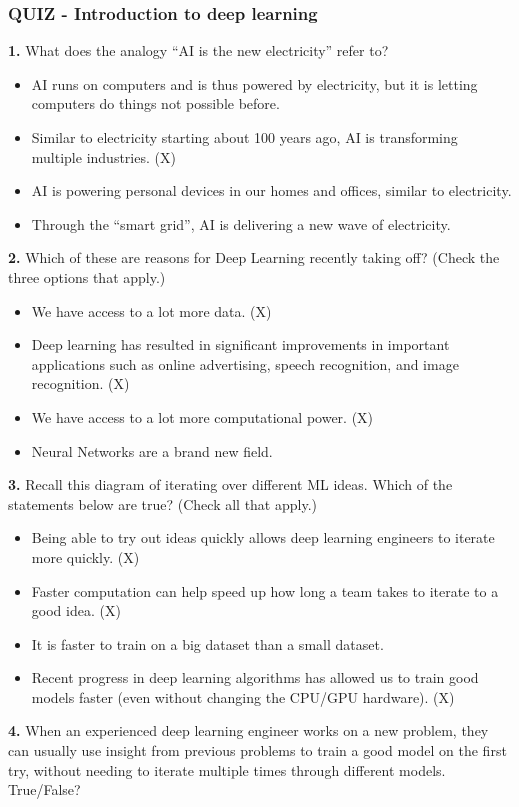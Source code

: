 \subsubsection*{QUIZ - Introduction to deep learning}
\textbf{1.} What does the analogy “AI is the new electricity” refer to?
\begin{itemize}
    \item AI runs on computers and is thus powered by electricity, but it is letting computers do things not possible before.
    \item Similar to electricity starting about 100 years ago, AI is transforming multiple industries. (X)
    \item AI is powering personal devices in our homes and offices, similar to electricity.
    \item Through the “smart grid”, AI is delivering a new wave of electricity.
\end{itemize}
\textbf{2.} Which of these are reasons for Deep Learning recently taking off? (Check the three options that apply.)
\begin{itemize}
    \item We have access to a lot more data. (X)
    \item Deep learning has resulted in significant improvements in important applications such as online advertising, speech recognition, and image recognition. (X)
    \item We have access to a lot more computational power. (X)
    \item Neural Networks are a brand new field.
\end{itemize}
\textbf{3.} Recall this diagram of iterating over different ML ideas. Which of the statements below are true? (Check all that apply.)
\begin{itemize}
    \item Being able to try out ideas quickly allows deep learning engineers to iterate more quickly. (X)
    \item Faster computation can help speed up how long a team takes to iterate to a good idea. (X)
    \item It is faster to train on a big dataset than a small dataset.
    \item Recent progress in deep learning algorithms has allowed us to train good models faster (even without changing the CPU/GPU hardware). (X)
\end{itemize}
\textbf{4.} When an experienced deep learning engineer works on a new problem, they can usually use insight from previous problems to train a good model on the first try, without needing to iterate multiple times through different models. True/False?
